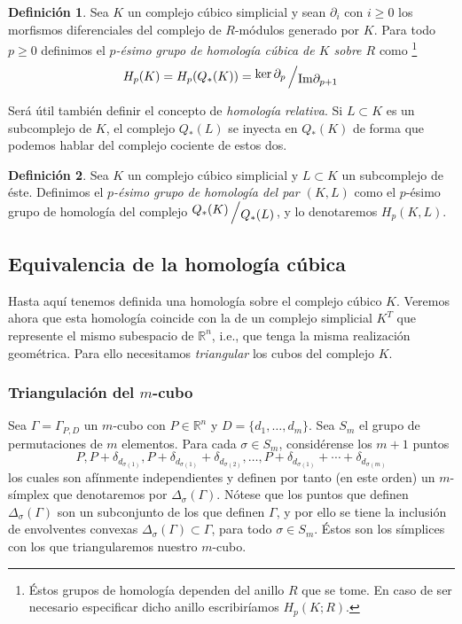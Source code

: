 \documentclass[12pt,a4paper,twoside]{article} %
\theoremstyle{plain}
\theoremstyle{definition}
\newtheorem{definicion}{Definición}[subsection]
\newcommand{\R}{\mathbb{R}}
\newcommand{\Img}[1]{\mathrm{Im}#1}
\newcommand{\quotient}[2]{{\raisebox{.2em}{$#1$}\left/\raisebox{-.2em}{$#2$}\right.}}
\begin{document}
\begin{definicion}
Sea $K$ un complejo cúbico simplicial y sean $\partial_i$ con $i\geq0$ los morfismos diferenciales del complejo de $R$-módulos generado por $K$. Para todo $p\geq 0$ definimos el \emph{$p$-ésimo grupo de homología cúbica de $K$ sobre $R$} como \footnote{Éstos grupos de homología dependen del anillo $R$ que se tome. En caso de ser necesario especificar dicho anillo escribiríamos $H_p(K;R)$.}
$$ H_p(K) =  H_p(Q_*(K)) = \quotient{\ker{\partial_p}}{\Img{\partial_{p+1}}}$$
\end{definicion}

Será útil también definir el concepto de \emph{homología relativa}. Si $L \subset K$ es un subcomplejo de $K$, el complejo $Q_*(L)$ se inyecta en $Q_*(K)$ de forma que podemos hablar del complejo cociente de estos dos.

\begin{definicion}
Sea $K$ un complejo cúbico simplicial y $L \subset K$ un subcomplejo de éste. Definimos el \emph{$p$-ésimo grupo de homología del par $(K,L)$} como el $p$-ésimo grupo de homología del complejo $\quotient{Q_*(K)}{Q_*(L)}$, y lo denotaremos $H_p(K,L)$.
\end{definicion}

\subsection{Equivalencia de la homología cúbica}

Hasta aquí tenemos definida una homología sobre el complejo cúbico $K$. Veremos ahora que esta homología coincide con la de un complejo simplicial $K^T$ que represente el mismo subespacio de $\R^n$, i.e., que tenga la misma realización geométrica. Para ello necesitamos \emph{triangular} los cubos del complejo $K$.

\subsubsection{Triangulación del $m$-cubo}
Sea $\Gamma = \Gamma_{P,D}$ un $m$-cubo con $P\in\R^n$ y $D=\{d_1,\dots,d_m\}$. Sea $S_m$ el grupo de permutaciones de $m$ elementos. Para cada $\sigma \in S_m$, considérense los $m+1$ puntos
$$P, P+\delta_{d_{\sigma(1)}}, P+\delta_{d_{\sigma(1)}}+\delta_{d_{\sigma(2)}},\dots,P+\delta_{d_{\sigma(1)}}+\cdots+\delta_{d_{\sigma(m)}}$$
los cuales son afínmente independientes y definen por tanto (en este orden) un $m$-símplex que denotaremos por $\Delta_\sigma(\Gamma)$. Nótese que los puntos que definen $\Delta_\sigma(\Gamma)$ son un subconjunto de los que definen $\Gamma$, y por ello se tiene la inclusión de envolventes convexas $\Delta_\sigma(\Gamma) \subset \Gamma$, para todo $\sigma \in S_m$. Éstos son los símplices con los que triangularemos nuestro $m$-cubo.
\end{document}
